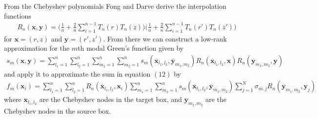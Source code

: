 \documentclass[11pt, oneside]{article}   	%
\begin{document}
From the Chebyshev polynomials Fong and Darve derive the interpolation functions
\begin{align*}
R_n(\mathbf{x},\mathbf{y}) = \bigg(\frac{1}{n} + \frac{2}{n}\sum_{i=1}^{n-1}T_n(r)T_n(z)\bigg)\bigg(\frac{1}{n} + \frac{2}{n}\sum_{i=1}^{n-1}T_n(r')T_n(z')\bigg)
\end{align*}
for $\mathbf{x}=(r,z)$ and $\mathbf{y}=(r',z')$. From there we can construct a low-rank approximation for the $m$th modal Green's function given by
\begin{align}
s_m(\mathbf{x},\mathbf{y}) = \sum_{l_1=1}^n\sum_{l_2=1}^n\sum_{m_1=1}^n\sum_{m_2=1}^n s_m(\mathbf{\overline{x}}_{l_1,l_2},\mathbf{\overline{y}}_{m_1,m_2})R_n(\mathbf{\overline{x}}_{l_1,l_2},\mathbf{x})R_n(\mathbf{\overline{y}}_{m_1,m_2},\mathbf{y})
\end{align}
and apply it to approximate the sum in equation $(12)$ by
\begin{align}
f_m(\mathbf{x}_i)=\sum_{l_1=1}^n \sum_{l_2=1}^n R_n(\mathbf{\overline{x}}_{l_1,l_2},\mathbf{x}_i) \sum_{m_1=1}^n \sum_{m_2=1}^n s_m(\mathbf{\overline{x}}_{l_1,l_2},\mathbf{\overline{y}}_{m_1,m_2}) \sum_{j=1}^N \sigma_{m,j}R_n(\mathbf{\overline{y}}_{m_1,m_2},\mathbf{y}_j)
\end{align}
where $\mathbf{\overline{x}}_{l_1,l_2}$ are the Chebyshev nodes in the target box, and $\mathbf{\overline{y}}_{m_1,m_2}$ are the Chebyshev nodes in the source box.
\end{document}
